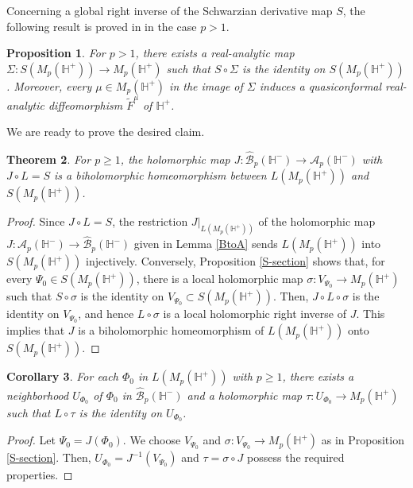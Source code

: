 \documentclass[amstex,12pt,reqno]{amsart}
\newtheorem{theorem}{Theorem}[section]
\newtheorem{proposition}[theorem]{Proposition}
\newtheorem{corollary}[theorem]{Corollary}
\theoremstyle{definition}
\begin{document}
Concerning a global right inverse of the Schwarzian derivative map $S$, 
the following result is proved in \cite[Theorem 1.4]{WM-3} in the case $p>1$.

\begin{proposition}\label{global}
For $p>1$, there exists a real-analytic map $\Sigma:S(M_p(\mathbb H^+)) \to M_p(\mathbb H^+)$ such that
$S \circ \Sigma$ is the identity on $S(M_p(\mathbb H^+))$. Moreover, every $\mu \in M_p(\mathbb H^+)$ in the image of $\Sigma$
induces a quasiconformal real-analytic diffeomorphism $\widetilde F^\mu$ of $\mathbb H^+$. 
\end{proposition}

We are ready to prove the desired claim.

\begin{theorem}\label{SL}
For $p \geq 1$,
the holomorphic map 
$J:\widehat{\mathcal B}_p(\mathbb H^-) \to {\mathcal A}_p(\mathbb H^-)$ with
$J \circ L=S$ is a biholomorphic homeomorphism between $L(M_p(\mathbb H^+))$ and
$S(M_p(\mathbb H^+))$. 
\end{theorem}

\begin{proof}
Since $J \circ L=S$,
the restriction $J|_{L(M_p(\mathbb H^+))}$
of the holomorphic map $J:{\mathcal A}_p(\mathbb H^-) \to \widehat{\mathcal B}_p(\mathbb H^-)$ 
given in Lemma \ref{BtoA}
sends $L(M_p(\mathbb H^+))$ into $S(M_p(\mathbb H^+))$ injectively. Conversely, Proposition \ref{S-section}
shows that, for every 
$\Psi_0 \in S(M_p(\mathbb H^+))$, there is a local holomorphic map $\sigma:V_{\Psi_0} \to M_p(\mathbb H^+)$ 
such that
$S \circ \sigma$ is the identity on $V_{\Psi_0} \subset S(M_p(\mathbb H^+))$. Then,
$J \circ L\circ \sigma$ is the identity on $V_{\Psi_0}$, and hence $L\circ \sigma$ is a local holomorphic right
inverse of $J$. This implies that $J$ is a
biholomorphic homeomorphism of $L(M_p(\mathbb H^+))$ onto $S(M_p(\mathbb H^+))$.
\end{proof}

\begin{corollary}\label{L-section}
For each $\Phi_0$ in $L(M_p(\mathbb H^+))$ 
with $p \geq 1$, there exists a
neighborhood $U_{\Phi_0}$ of $\Phi_0$ in $\widehat {\mathcal B}_p(\mathbb H^-)$ 
and a holomorphic map $\tau:U_{\Phi_0} \to M_p(\mathbb H^+)$ such that
$L \circ \tau$ is the identity on $U_{\Phi_0}$.
\end{corollary}

\begin{proof}
Let $\Psi_0=J(\Phi_0)$. We choose $V_{\Psi_0}$ and $\sigma:V_{\Psi_0} \to M_p(\mathbb H^+)$ as in Proposition \ref{S-section}.
Then, $U_{\Phi_0}=J^{-1}(V_{\Psi_0})$ and $\tau=\sigma \circ J$ possess the required properties. 
\end{proof}
\end{document}
